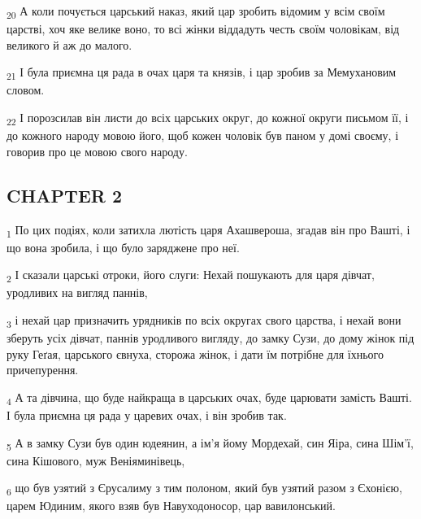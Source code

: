 \begin{tcolorbox}
\textsubscript{20} А коли почується царський наказ, який цар зробить відомим у всім своїм царстві, хоч яке велике воно, то всі жінки віддадуть честь своїм чоловікам, від великого й аж до малого.
\end{tcolorbox}
\begin{tcolorbox}
\textsubscript{21} І була приємна ця рада в очах царя та князів, і цар зробив за Мемухановим словом.
\end{tcolorbox}
\begin{tcolorbox}
\textsubscript{22} І порозсилав він листи до всіх царських округ, до кожної округи письмом її, і до кожного народу мовою його, щоб кожен чоловік був паном у домі своєму, і говорив про це мовою свого народу.
\end{tcolorbox}
\subsection{CHAPTER 2}
\begin{tcolorbox}
\textsubscript{1} По цих подіях, коли затихла лютість царя Ахашвероша, згадав він про Вашті, і що вона зробила, і що було заряджене про неї.
\end{tcolorbox}
\begin{tcolorbox}
\textsubscript{2} І сказали царські отроки, його слуги: Нехай пошукають для царя дівчат, уродливих на вигляд паннів,
\end{tcolorbox}
\begin{tcolorbox}
\textsubscript{3} і нехай цар призначить урядників по всіх округах свого царства, і нехай вони зберуть усіх дівчат, паннів уродливого вигляду, до замку Сузи, до дому жінок під руку Геґая, царського євнуха, сторожа жінок, і дати їм потрібне для їхнього причепурення.
\end{tcolorbox}
\begin{tcolorbox}
\textsubscript{4} А та дівчина, що буде найкраща в царських очах, буде царювати замість Вашті. І була приємна ця рада у царевих очах, і він зробив так.
\end{tcolorbox}
\begin{tcolorbox}
\textsubscript{5} А в замку Сузи був один юдеянин, а ім'я йому Мордехай, син Яіра, сина Шім'ї, сина Кішового, муж Веніяминівець,
\end{tcolorbox}
\begin{tcolorbox}
\textsubscript{6} що був узятий з Єрусалиму з тим полоном, який був узятий разом з Єхонією, царем Юдиним, якого взяв був Навуходоносор, цар вавилонський.
\end{tcolorbox}

